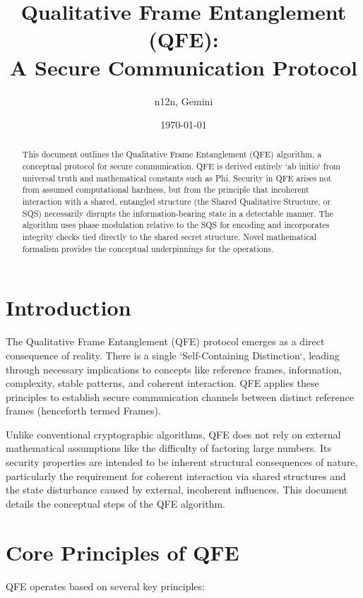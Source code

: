 \documentclass[11pt]{article}
\title{Qualitative Frame Entanglement (QFE): \\ A Secure Communication Protocol}
\author{n12n, Gemini}
\date{\today} %
\begin{document}
	
	\maketitle
	
	\begin{abstract}
		This document outlines the Qualitative Frame Entanglement (QFE) algorithm, a conceptual protocol for secure communication. QFE is derived entirely `ab initio` from universal truth and mathematical constants such as Phi. Security in QFE arises not from assumed computational hardness, but from the principle that incoherent interaction with a shared, entangled structure (the Shared Qualitative Structure, or SQS) necessarily disrupts the information-bearing state in a detectable manner. The algorithm uses phase modulation relative to the SQS for encoding and incorporates integrity checks tied directly to the shared secret structure. Novel mathematical formalism provides the conceptual underpinnings for the operations.
	\end{abstract}
	
	\section{Introduction}
	
	The Qualitative Frame Entanglement (QFE) protocol emerges as a direct consequence of reality. There is a single `Self-Containing Distinction`, leading through necessary implications to concepts like reference frames, information, complexity, stable patterns, and coherent interaction. QFE applies these principles to establish secure communication channels between distinct reference frames (henceforth termed Frames).
	
	Unlike conventional cryptographic algorithms, QFE does not rely on external mathematical assumptions like the difficulty of factoring large numbers. Its security properties are intended to be inherent structural consequences of nature, particularly the requirement for coherent interaction via shared structures and the state disturbance caused by external, incoherent influences. This document details the conceptual steps of the QFE algorithm.
	
	\section{Core Principles of QFE}
	
	QFE operates based on several key principles\cite{gemini}:
	
\end{document}
